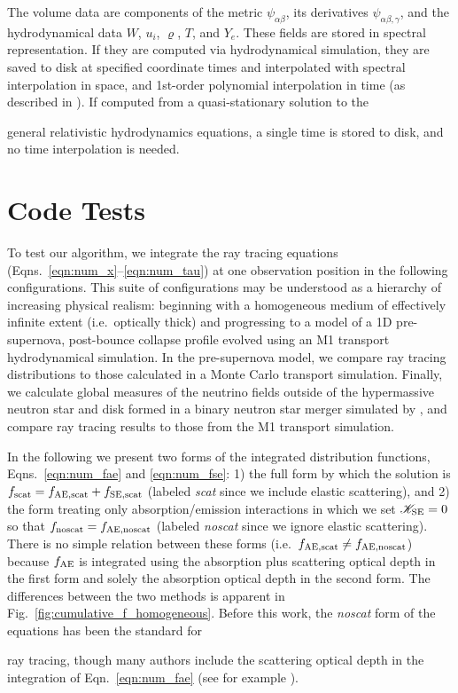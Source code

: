 \documentclass[aps,floatfix,prd,superscriptaddress,twocolumn]{revtex4-1}
\newcommand{\todo}[1]{\marginpar{\tiny{\textcolor{red}{#1}}}}
\renewcommand\todo[1]{} %
\begin{document}
The volume data are components of the metric $\psi_{\alpha\beta}$,
its derivatives $\psi_{\alpha\beta,\gamma}$,
and the hydrodynamical data $W$, $u_i$, $\varrho$, $T$, and $Y_e$.
These fields are stored in spectral representation.
If they are computed via hydrodynamical simulation, they are saved to disk
at specified coordinate times and interpolated
with spectral interpolation in space,
and 1st-order polynomial interpolation in time
(as described in \cite[App.~B]{bohn2016-code}).
If computed from a quasi-stationary solution to the
\todo{clarify quasistationary timescale}
general relativistic hydrodynamics equations,
a single time is stored to disk, and no time interpolation is needed.

\section{Code Tests}
\label{sec:tests}

To test our algorithm, we integrate the ray tracing equations
(Eqns.~\ref{eqn:num_x}--\ref{eqn:num_tau}) at one observation position
in the following configurations. This suite of configurations
may be understood as a hierarchy of increasing physical realism:
beginning with a homogeneous medium of effectively
infinite extent (i.e.\ optically thick) and progressing to a model of a
1D pre-supernova, post-bounce collapse profile
evolved using an M1 transport hydrodynamical simulation.
In the pre-supernova model, we compare ray tracing distributions
to those calculated in a Monte Carlo transport simulation.
Finally, we calculate global measures of the neutrino fields outside of the
hypermassive neutron star and disk formed in a binary neutron star
merger simulated by \cite{fouc2016-m1_nsns, fouc2016-m1_evolve_n},
and compare ray tracing results to those from the M1 transport simulation.

In the following we present two forms of the integrated distribution functions,
Eqns.~\ref{eqn:num_fae} and \ref{eqn:num_fse}:
1) the full form  by which the solution is $f_{\rm scat}=f_{\rm AE,scat}+f_{\rm SE,scat}$
(labeled \emph{scat} since we include elastic scattering), and
2) the form treating only absorption/emission interactions
in which we set $\mathscr{K}_{\rm SE}=0$ so that $f_{\rm noscat}=f_{\rm AE,noscat}$
(labeled \emph{noscat} since we ignore elastic scattering).
There is no simple relation between these forms
(i.e.\ $f_{\rm AE,scat} \neq f_{\rm AE,noscat}$)
because $f_{\rm AE}$ is integrated using the absorption plus scattering optical depth
in the first form and solely the absorption optical depth in the second form.
The differences between the two methods is apparent
in Fig.~\ref{fig:cumulative_f_homogeneous}.
Before this work, the \emph{noscat} form of the equations has been the standard for
\todo{explain why; cite others}
ray tracing, though many authors include the scattering optical depth in
the integration of Eqn.~\ref{eqn:num_fae}
(see for example \cite{hari2010-gr_nunubar_collapsar}).
\end{document}

